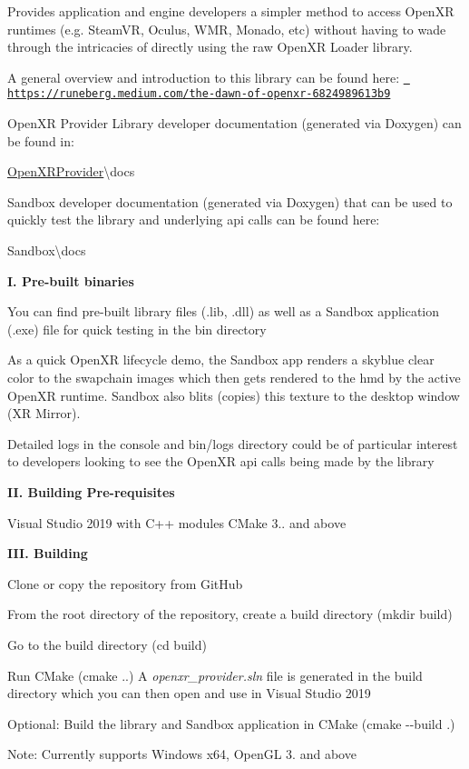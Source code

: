 Provides application and engine developers a simpler method to access Open\+XR runtimes (e.\+g. Steam\+VR, Oculus, W\+MR, Monado, etc) without having to wade through the intricacies of directly using the raw Open\+XR Loader library.

A general overview and introduction to this library can be found here\+: \href{https://runeberg.medium.com/the-dawn-of-openxr-6824989613b9}{\texttt{ https\+://runeberg.\+medium.\+com/the-\/dawn-\/of-\/openxr-\/6824989613b9}}

Open\+XR Provider Library developer documentation (generated via Doxygen) can be found in\+:

{\ttfamily \mbox{\hyperlink{namespace_open_x_r_provider}{Open\+X\+R\+Provider}}\textbackslash{}docs}

Sandbox developer documentation (generated via Doxygen) that can be used to quickly test the library and underlying api calls can be found here\+:

{\ttfamily Sandbox\textbackslash{}docs}

{\bfseries{I. Pre-\/built binaries}}

You can find pre-\/built library files (.lib, .dll) as well as a Sandbox application (.exe) file for quick testing in the {\ttfamily bin} directory

As a quick Open\+XR lifecycle demo, the Sandbox app renders a skyblue clear color to the swapchain images which then gets rendered to the hmd by the active Open\+XR runtime. Sandbox also blits (copies) this texture to the desktop window (XR Mirror).

Detailed logs in the console and {\ttfamily bin/logs} directory could be of particular interest to developers looking to see the Open\+XR api calls being made by the library

{\bfseries{II. Building Pre-\/requisites}}

Visual Studio 2019 with C++ modules C\+Make 3.. and above

{\bfseries{I\+II. Building}}


\begin{DoxyEnumerate}
\item Clone or copy the repository from Git\+Hub
\item From the root directory of the repository, create a build directory ({\ttfamily mkdir build})
\item Go to the build directory ({\ttfamily cd build})
\item Run C\+Make ({\ttfamily cmake ..}) A {\itshape openxr\+\_\+provider.\+sln} file is generated in the build directory which you can then open and use in Visual Studio 2019
\item Optional\+: Build the library and Sandbox application in C\+Make ({\ttfamily cmake -\/-\/build .})
\end{DoxyEnumerate}

Note\+: Currently supports Windows x64, Open\+GL 3. and above 